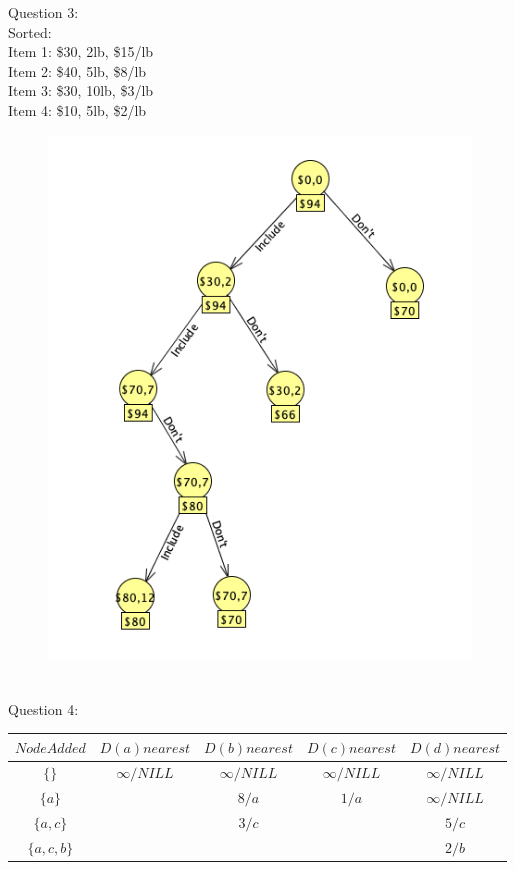 \documentclass[12pt]{article}
\newcommand\tab[1][1cm]{\hspace*{#1}}
\begin{document}
\pagebreak
Question 3:\\
\tab Sorted:\\
\tab Item 1: \$30, 2lb, \$15/lb\\
\tab Item 2: \$40, 5lb, \$8/lb\\
\tab Item 3: \$30, 10lb, \$3/lb\\
\tab Item 4: \$10, 5lb, \$2/lb
\begin{figure}[ht]
  \includegraphics[width=11.7cm]{Q3.png}
\end{figure}\\

\pagebreak
Question 4:
\begin{center}
\begin{tabular}{|c|c|c|c|c|}
\hline
$Node Added$ & $D(a) nearest$ & $D(b) nearest$ &$D(c) nearest$ & $D(d) nearest$ \\
\hline
$\{\}$ & $\infty /NILL$ & $\infty /NILL$ & $\infty /NILL$ & $\infty /NILL$ \\
\hline
$\{a\}$ &  & $8/a$ & $1/a$ & $\infty /NILL$ \\
\hline
$\{a,c\}$ &  & $3/c$ &  & $5/c$ \\
\hline
$\{a,c,b\}$ &  &  &  & $2/b$ \\
\hline
\end{tabular}\\
\end{center}
\end{document}
